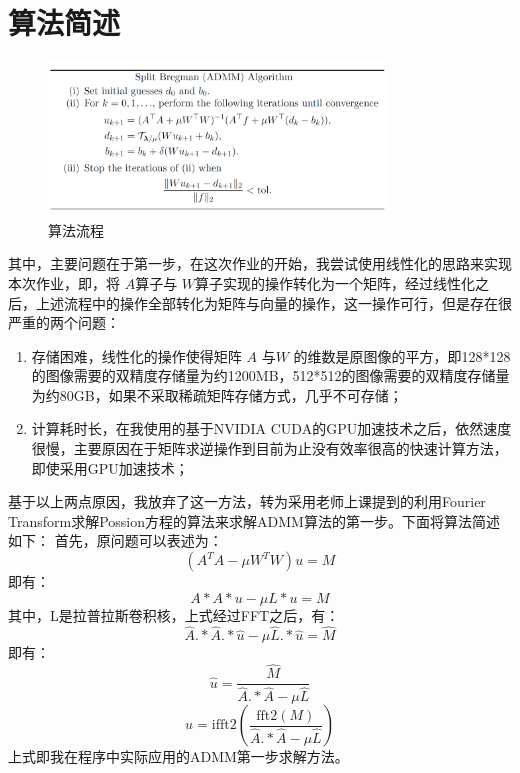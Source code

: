 \documentclass[a4paper, UTF8]{ctexrep}
\begin{document}
	\section{算法简述}
		\begin{figure}
			\centering
			\includegraphics[width=0.8\textwidth]{fig1.png}
			\caption{算法流程}
		\end{figure}
		其中，主要问题在于第一步，在这次作业的开始，我尝试使用线性化的思路来实现本次作业，即，将 $A$算子与 $W$算子实现的操作转化为一个矩阵，经过线性化之后，上述流程中的操作全部转化为矩阵与向量的操作，这一操作可行，但是存在很严重的两个问题：
		\begin{enumerate}
			\item 存储困难，线性化的操作使得矩阵 $A$ 与$W$ 的维数是原图像的平方，即128*128的图像需要的双精度存储量为约1200MB，512*512的图像需要的双精度存储量为约80GB，如果不采取稀疏矩阵存储方式，几乎不可存储；
			\item 计算耗时长，在我使用的基于NVIDIA CUDA的GPU加速技术之后，依然速度很慢，主要原因在于矩阵求逆操作到目前为止没有效率很高的快速计算方法，即使采用GPU加速技术；
		\end{enumerate}
		基于以上两点原因，我放弃了这一方法，转为采用老师上课提到的利用Fourier Transform求解Possion方程的算法来求解ADMM算法的第一步。下面将算法简述如下：
		首先，原问题可以表述为：
		\begin{equation}
			\left( A^T A - \mu W^T W \right) u = M
		\end{equation}
		即有：
		\begin{equation}
			A * A * u - \mu L * u = M
		\end{equation}
		其中，L是拉普拉斯卷积核，上式经过FFT之后，有：
		\begin{equation}
			\hat A .* \hat A .* \hat u - \mu \hat L .* \hat u = \hat M
		\end{equation}
		即有：
		\begin{equation}
			\hat u = \frac{\hat M}{\hat A .* \hat A - \mu \hat L}
		\end{equation}
		\begin{equation}
			u = \mathrm{ifft2} \left( \frac{\mathrm{fft2} \left( M \right)}{\hat A .* \hat A - \mu \hat L} \right)
		\end{equation}
		上式即我在程序中实际应用的ADMM第一步求解方法。
\end{document}

